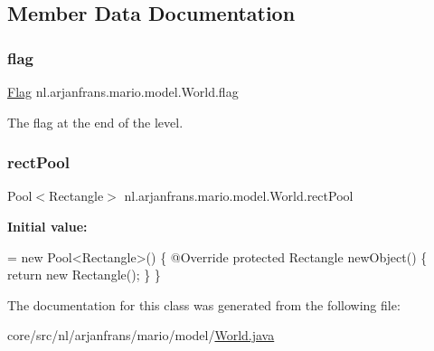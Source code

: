 \subsection{Member Data Documentation}
\mbox{\label{classnl_1_1arjanfrans_1_1mario_1_1model_1_1World_aec8e34706fcbbe139ec462e76560589c}} 
\subsubsection{\texorpdfstring{flag}{flag}}
{\footnotesize\ttfamily \hyperlink{classnl_1_1arjanfrans_1_1mario_1_1model_1_1Flag}{Flag} nl.\+arjanfrans.\+mario.\+model.\+World.\+flag\hspace{0.3cm}{\ttfamily [private]}}

The flag at the end of the level. \mbox{\label{classnl_1_1arjanfrans_1_1mario_1_1model_1_1World_aade75cccc0453f6fb45a35b3513f02ef}} 
\subsubsection{\texorpdfstring{rect\+Pool}{rectPool}}
{\footnotesize\ttfamily Pool$<$Rectangle$>$ nl.\+arjanfrans.\+mario.\+model.\+World.\+rect\+Pool\hspace{0.3cm}{\ttfamily [private]}}

{\bfseries Initial value\+:}
\begin{DoxyCode}
= \textcolor{keyword}{new} Pool<Rectangle>()
    \{
        @Override
        \textcolor{keyword}{protected} Rectangle newObject()
        \{
            \textcolor{keywordflow}{return} \textcolor{keyword}{new} Rectangle();
        \}
    \}
\end{DoxyCode}


The documentation for this class was generated from the following file\+:\begin{DoxyCompactItemize}
\item 
core/src/nl/arjanfrans/mario/model/\hyperlink{World_8java}{World.\+java}\end{DoxyCompactItemize}
